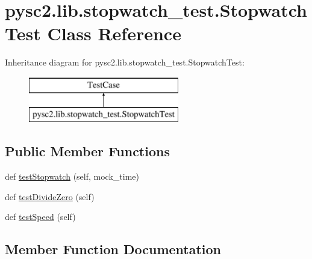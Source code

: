 \hypertarget{classpysc2_1_1lib_1_1stopwatch__test_1_1_stopwatch_test}{}\section{pysc2.\+lib.\+stopwatch\+\_\+test.\+Stopwatch\+Test Class Reference}
\label{classpysc2_1_1lib_1_1stopwatch__test_1_1_stopwatch_test}
Inheritance diagram for pysc2.\+lib.\+stopwatch\+\_\+test.\+Stopwatch\+Test\+:\begin{figure}[H]
\begin{center}
\leavevmode
\includegraphics[height=2.000000cm]{classpysc2_1_1lib_1_1stopwatch__test_1_1_stopwatch_test}
\end{center}
\end{figure}
\subsection*{Public Member Functions}
\begin{DoxyCompactItemize}
\item 
def \mbox{\hyperlink{classpysc2_1_1lib_1_1stopwatch__test_1_1_stopwatch_test_a6a127bb92911432cfc6b2566453c3d71}{test\+Stopwatch}} (self, mock\+\_\+time)
\item 
def \mbox{\hyperlink{classpysc2_1_1lib_1_1stopwatch__test_1_1_stopwatch_test_a5369dcd57d03704c6276c3f4838b0f0f}{test\+Divide\+Zero}} (self)
\item 
def \mbox{\hyperlink{classpysc2_1_1lib_1_1stopwatch__test_1_1_stopwatch_test_a33e9450263a55fc60359d7b6407d450e}{test\+Speed}} (self)
\end{DoxyCompactItemize}


\subsection{Member Function Documentation}
\mbox{\label{classpysc2_1_1lib_1_1stopwatch__test_1_1_stopwatch_test_a5369dcd57d03704c6276c3f4838b0f0f}} 
